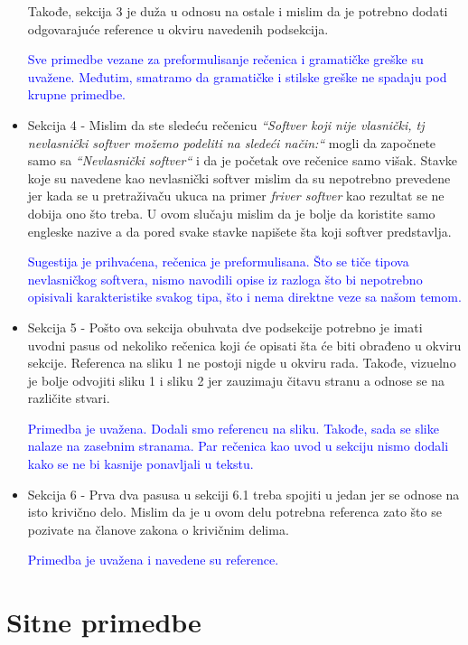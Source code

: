 \documentclass[a4paper]{report}
\newcommand{\odgovor}[1]{\textcolor{blue}{#1}}
\begin{document}
\begin{itemize}
\begin{itemize}
		\end{itemize}
	Takođe, sekcija 3 je duža u odnosu na ostale i mislim da je potrebno dodati odgovarajuće reference u okviru navedenih podsekcija.
		
	\odgovor{
		Sve primedbe vezane za preformulisanje rečenica i gramatičke greške su uvažene. Međutim, smatramo da gramatičke i stilske greške ne spadaju pod krupne primedbe.
	}

	\item Sekcija 4 - Mislim da ste sledeću rečenicu \emph{``Softver koji nije vlasnički, tj nevlasnički softver možemo podeliti na sledeći način:``} mogli da započnete samo sa \emph{``Nevlasnički softver``} 
	i da je početak ove rečenice samo višak. 
	Stavke koje su navedene kao nevlasnički softver mislim da su nepotrebno prevedene jer kada se u pretraživaču ukuca na primer \emph{friver softver}
	kao rezultat se ne dobija ono što treba. U ovom slučaju mislim da je bolje da koristite samo engleske nazive a da pored svake stavke napišete šta koji softver predstavlja.

	\odgovor {
		Sugestija je prihvaćena, rečenica je preformulisana.
		Što se tiče tipova nevlasničkog softvera, nismo navodili opise iz razloga što bi nepotrebno opisivali
		karakteristike svakog tipa, što i nema direktne veze sa našom temom.
	}
	
	\item Sekcija 5 - Pošto ova sekcija obuhvata dve podsekcije potrebno je imati uvodni pasus od nekoliko rečenica koji će opisati šta će biti obrađeno u okviru sekcije.
			Referenca na sliku 1 ne postoji nigde u okviru rada. Takođe, vizuelno je bolje odvojiti sliku 1 i sliku 2 jer zauzimaju čitavu stranu a odnose se na različite stvari.
	
	\odgovor{
		Primedba je uvažena. Dodali smo referencu na sliku. Takođe, sada se slike nalaze na zasebnim stranama.
		Par rečenica kao uvod u sekciju nismo dodali kako se ne bi kasnije ponavljali u tekstu.
	}

	\item Sekcija 6 - Prva dva pasusa u sekciji 6.1 treba spojiti u jedan jer se odnose na isto krivično delo. Mislim da je u ovom delu potrebna referenca zato što
		 se pozivate na članove zakona o krivičnim delima. 

	\odgovor{
		Primedba je uvažena i navedene su reference.
	}

\end{itemize}

\section{Sitne primedbe}
\end{document}
